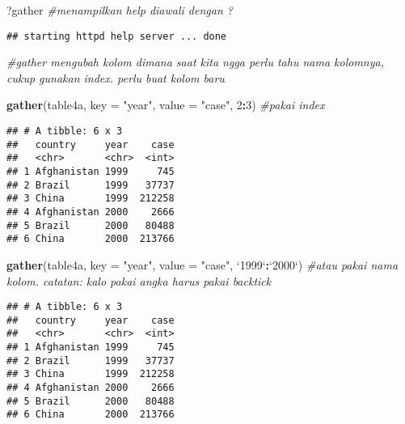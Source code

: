 \documentclass[]{article}
\newenvironment{Shaded}{\begin{snugshade}}{\end{snugshade}}
\newcommand{\CommentTok}[1]{\textcolor[rgb]{0.56,0.35,0.01}{\textit{#1}}}
\newcommand{\DataTypeTok}[1]{\textcolor[rgb]{0.13,0.29,0.53}{#1}}
\newcommand{\DecValTok}[1]{\textcolor[rgb]{0.00,0.00,0.81}{#1}}
\newcommand{\KeywordTok}[1]{\textcolor[rgb]{0.13,0.29,0.53}{\textbf{#1}}}
\newcommand{\NormalTok}[1]{#1}
\newcommand{\OperatorTok}[1]{\textcolor[rgb]{0.81,0.36,0.00}{\textbf{#1}}}
\newcommand{\StringTok}[1]{\textcolor[rgb]{0.31,0.60,0.02}{#1}}
\begin{document}
\begin{Shaded}
\begin{Highlighting}[]
\NormalTok{?gather }\CommentTok{#menampilkan help diawali dengan ?}
\end{Highlighting}
\end{Shaded}

\begin{verbatim}
## starting httpd help server ... done
\end{verbatim}

\begin{Shaded}
\begin{Highlighting}[]
\CommentTok{#gather mengubah kolom dimana saat kita ngga perlu tahu nama kolomnya, cukup gunakan index. perlu buat kolom baru}

\KeywordTok{gather}\NormalTok{(table4a, }\DataTypeTok{key =} \StringTok{"year"}\NormalTok{, }\DataTypeTok{value =} \StringTok{"case"}\NormalTok{, }\DecValTok{2}\OperatorTok{:}\DecValTok{3}\NormalTok{) }\CommentTok{#pakai index}
\end{Highlighting}
\end{Shaded}

\begin{verbatim}
## # A tibble: 6 x 3
##   country     year    case
##   <chr>       <chr>  <int>
## 1 Afghanistan 1999     745
## 2 Brazil      1999   37737
## 3 China       1999  212258
## 4 Afghanistan 2000    2666
## 5 Brazil      2000   80488
## 6 China       2000  213766
\end{verbatim}

\begin{Shaded}
\begin{Highlighting}[]
\KeywordTok{gather}\NormalTok{(table4a, }\DataTypeTok{key =} \StringTok{"year"}\NormalTok{, }\DataTypeTok{value =} \StringTok{"case"}\NormalTok{, }\StringTok{`}\DataTypeTok{1999}\StringTok{`}\OperatorTok{:}\StringTok{`}\DataTypeTok{2000}\StringTok{`}\NormalTok{) }\CommentTok{#atau pakai nama kolom. catatan: kalo pakai angka harus pakai backtick}
\end{Highlighting}
\end{Shaded}

\begin{verbatim}
## # A tibble: 6 x 3
##   country     year    case
##   <chr>       <chr>  <int>
## 1 Afghanistan 1999     745
## 2 Brazil      1999   37737
## 3 China       1999  212258
## 4 Afghanistan 2000    2666
## 5 Brazil      2000   80488
## 6 China       2000  213766
\end{verbatim}
\end{document}
